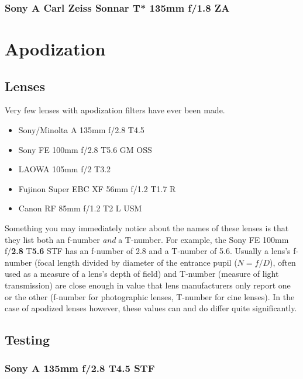 \documentclass{article}
\begin{document}
\subsubsection{Sony A Carl Zeiss Sonnar T* 135mm f/1.8 ZA}

\section{Apodization}

\subsection{Lenses}

Very few lenses with apodization filters have ever been made.

\begin{itemize}
	\item Sony/Minolta A 135mm f/2.8 T4.5 \textbf{}
	\item Sony FE 100mm f/2.8 T5.6 \textbf{} GM OSS
	\item LAOWA 105mm f/2 T3.2 \textbf{}
	\item Fujinon Super EBC XF 56mm f/1.2 T1.7 R \textbf{}
	\item Canon RF 85mm f/1.2 T2 L USM \textbf{}
\end{itemize}

Something you may immediately notice about the names of these lenses is that
they list both an f-number \textit{and} a T-number.
For example, the Sony FE 100mm f/\textbf{2.8} T\textbf{5.6} STF has an
f-number of 2.8 and a T-number of 5.6.
Usually a lens's f-number (focal length divided by diameter of the entrance
pupil (\( N = f / D \)), often used as a measure of a lens's depth of field)
and T-number (measure of light transmission) are close enough in value that
lens manufacturers only report one or the other (f-number for photographic
lenses, T-number for cine lenses).
In the case of apodized lenses however, these values can and do differ quite
significantly.

\subsection{Testing}

\subsubsection{Sony A 135mm f/2.8 T4.5 STF}
\end{document}
